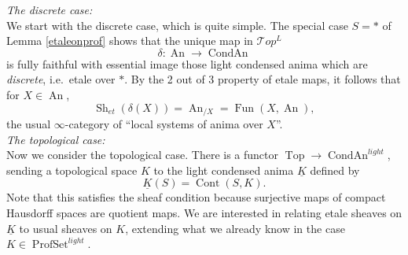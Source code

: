 \documentclass[12pt]{article}
\newcommand{\on}{\operatorname}
\begin{document}
\noindent\textit{The discrete case:}\label{etaleonetale}\\

We start with the discrete case, which is quite simple.  The special case $S=\ast$ of Lemma \ref{etaleonprof} shows that the unique map in $\mathcal{T}op^L$
$$\delta: \on{An}\rightarrow \on{CondAn}$$
is fully faithful with essential image those light condensed anima which are \emph{discrete}, i.e.\ etale over $\ast$.  By the 2 out of 3 property of etale maps, it follows that for $X\in\on{An}$,
$$\on{Sh}_{et}(\delta(X)) = \on{An}_{/X} = \on{Fun}(X,\on{An}),$$
the usual $\infty$-category of ``local systems of anima over $X$''.\\

\noindent\textit{The topological case:}\\

Now we consider the topological case.  There is a functor $\on{Top}\rightarrow \on{CondAn}^{light}$, sending a topological space $K$ to the light condensed anima $\underline{K}$ defined by
$$\underline{K}(S) = \on{Cont}(S,K).$$
Note that this satisfies the sheaf condition because surjective maps of compact Hausdorff spaces are quotient maps.  We are interested in relating etale sheaves on $\underline{K}$ to usual sheaves on $K$, extending what we already know in the case $K\in\on{ProfSet}^{light}$.
\end{document}
